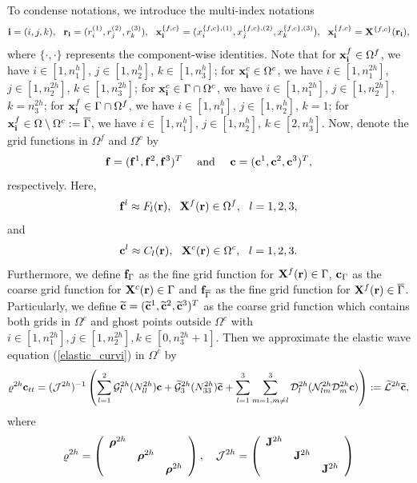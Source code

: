  To condense notations, we introduce the multi-index notations
\[{\bf i} = (i,j,k),\ \ {\bf r}_{\bf i} = (r^{(1)}_i,r^{(2)}_j,r^{(3)}_k),\ \ {\bf x}^{\{f,c\}}_{\bf i} = (x^{\{f,c\},(1)}_i,x^{\{f,c\},(2)}_j,x^{\{f,c\},(3)}_k),\ \ {\bf x}_{\bf i}^{\{f,c\}} = {\bf X}^{\{f,c\}}({\bf r}_{\bf i}),\]
where $\{\cdot,\cdot\}$ represents the component-wise identities. Note that for ${\bf x}^f_{\bf i}\in\Omega^f$, we have $i\in[1,n_1^h]$, $j\in[1,n_2^h]$, $k\in[1,n_3^h]$; for ${\bf x}^c_{\bf i}\in\Omega^c$, we have $i\in[1,n_1^{2h}]$, $j\in[1,n_2^{2h}]$, $k\in[1,n_3^{2h}]$; for ${\bf x}_{\bf i}^c \in \Gamma\cap\Omega^c$, we have $i\in[1,n_1^{2h}]$, $j\in[1,n_2^{2h}]$, $k = n_3^{2h}$; for ${\bf x}_{\bf i}^f \in \Gamma\cap\Omega^f$, we have $i\in[1,n_1^h]$, $j\in[1,n_2^h]$, $k = 1$; for ${\bf x}_{\bf i}^f\in \Omega \setminus \Omega^c := \overline{\Gamma}$, we have $i\in[1,n_1^h]$, $j\in[1,n_2^h]$, $k\in[2,n_3^h]$. %
Now, denote the grid functions in $\Omega^f$ and $\Omega^c$ by
\[{\bf f} = ({\bf f}^1, {\bf f}^2, {\bf f}^3)^T\ \ \ \ \mbox{and}\ \ \ \  {\bf c} = ({\bf c}^1, {\bf c}^2, {\bf c}^3)^T,\]
respectively. Here, 
\[{\bf f}^l\approx F_l({\bf r}), \ \ {\bf X}^f({\bf r})\in\Omega^f,\ \ l=1,2,3 ,\]
and
\[{\bf c}^l \approx C_l({\bf r}),\ \ {\bf X}^c({\bf r})\in\Omega^c, \ \ l = 1,2,3.\]
Furthermore, we define ${\bf f}_{\Gamma}$ as the fine grid function for ${\bf X}^f({{\bf r}})\in\Gamma$, ${\bf c}_{\Gamma}$ as the coarse grid function for ${\bf X}^c({{\bf r}})\in\Gamma$ and ${\bf f}_{\overline{\Gamma}}$ as the fine grid function for ${\bf X}^f({{\bf r}})\in\overline{\Gamma}$. Particularly, we define $\widetilde{\bf c} = (\widetilde{\bf c}^1,\widetilde{\bf c}^2,\widetilde{\bf c}^3)^T$ as the coarse grid function which contains both grids in $\Omega^c$ and ghost points outside $\Omega^c$ with $i\in[1,n_1^{2h}], j\in[1,n_2^{2h}], k\in[0,n_3^{2h}+1]$. Then we approximate the elastic wave equation (\ref{elastic_curvi}) in $\Omega^c$ by
\begin{equation}\label{elastic_semi_c}
{\varrho}^{2h} {\bf c}_{tt} =( \mathcal{ J}^{2h})^{-1}\left(\sum_{l=1}^2\mathcal{G}_l^{2h}({N}_{ll}^{2h}){\bf c}+\wt{\mathcal{G}}_3^{2h}({N}_{33}^{2h}){\wt{\bf c}}+\sum_{l=1}^3\sum_{m=1,m\neq l}^3\mathcal{D}_l^{2h}(\mathcal{N}_{lm}^{2h}\mathcal{D}_m^{2h}{\bf c})\right) := \wt{\mathcal{L}}^{2h} {\wt {\bf c}},
\end{equation}
where 
\begin{align}\label{rho_j}
\varrho^{2h} = \left(\begin{array}{ccc}
{\bm \rho}^{2h}& ~  & ~ \\
~ & {\bm \rho}^{2h} & ~ \\
~ &~  &{\bm \rho}^{2h}\end{array}\right),\ \ \ \mathcal{J}^{2h} = \left(\begin{array}{ccc}
{\bf J}^{2h}& ~  & ~ \\
~ & {\bf J}^{2h} & ~ \\
~ &~  &{\bf J}^{2h}\end{array}\right)
\end{align}
